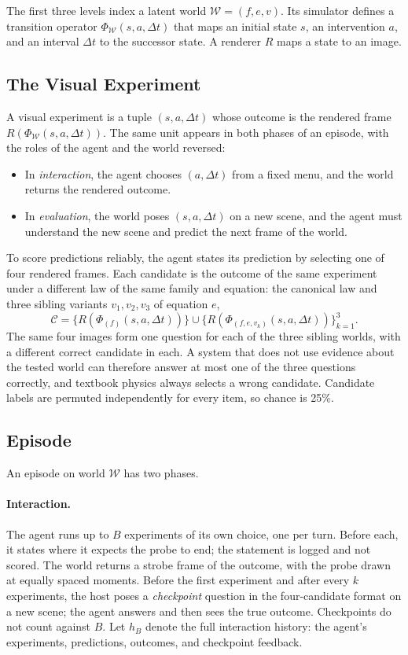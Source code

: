 The first three levels index a latent world $\mathcal{W}=(f,e,v)$. Its simulator defines a transition operator $\Phi_{\mathcal{W}}(s,a,\Delta t)$ that maps an initial state $s$, an intervention $a$, and an interval $\Delta t$ to the successor state. A renderer $R$ maps a state to an image.

\subsection{The Visual Experiment}

A visual experiment is a tuple $(s,a,\Delta t)$ whose outcome is the rendered frame $R(\Phi_{\mathcal{W}}(s,a,\Delta t))$. The same unit appears in both phases of an episode, with the roles of the agent and the world reversed:
\begin{itemize}
  \item In \emph{interaction}, the agent chooses $(a,\Delta t)$ from a fixed menu, and the world returns the rendered outcome.
  \item In \emph{evaluation}, the world poses $(s,a,\Delta t)$ on a new scene, and the agent must understand the new scene and predict the next frame of the world.
\end{itemize}
To score predictions reliably, the agent states its prediction by selecting one of four rendered frames. Each candidate is the outcome of the same experiment under a different law of the same family and equation: the canonical law and three sibling variants $v_1,v_2,v_3$ of equation $e$,
\begin{equation}
  \mathcal{C}=\{R(\Phi_{(f)}(s,a,\Delta t))\}\cup\{R(\Phi_{(f,e,v_k)}(s,a,\Delta t))\}_{k=1}^{3}.
  \label{eq:law-contrastive}
\end{equation}
The same four images form one question for each of the three sibling worlds, with a different correct candidate in each. A system that does not use evidence about the tested world can therefore answer at most one of the three questions correctly, and textbook physics always selects a wrong candidate. Candidate labels are permuted independently for every item, so chance is 25\%.

\subsection{Episode}

An episode on world $\mathcal{W}$ has two phases.

\paragraph{Interaction.} The agent runs up to $B$ experiments of its own choice, one per turn. Before each, it states where it expects the probe to end; the statement is logged and not scored. The world returns a strobe frame of the outcome, with the probe drawn at equally spaced moments. Before the first experiment and after every $k$ experiments, the host poses a \emph{checkpoint} question in the four-candidate format on a new scene; the agent answers and then sees the true outcome. Checkpoints do not count against $B$. Let $h_B$ denote the full interaction history: the agent's experiments, predictions, outcomes, and checkpoint feedback.

